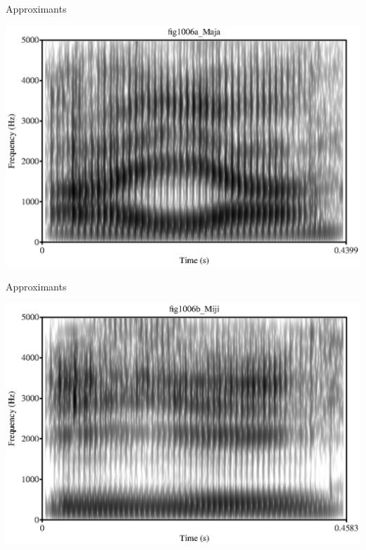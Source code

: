 \documentclass[professionalfonts]{beamer}
\begin{document}
\begin{frame}{Approximants}
    \begin{center}
        \includegraphics[width = \textwidth]{figs/aja.eps}
    \end{center}
\end{frame}

\begin{frame}{Approximants}
    \begin{center}
        \includegraphics[width = \textwidth]{figs/iji.eps}
    \end{center}
\end{frame}
\end{document}
